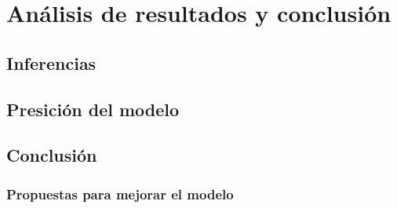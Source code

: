 \chapter{Análisis de resultados y conclusión}\label{ch:ResultadosConclusion}

\section{Inferencias}

\section{Presición del modelo}

\section{Conclusión}

\subsection{Propuestas para mejorar el modelo}